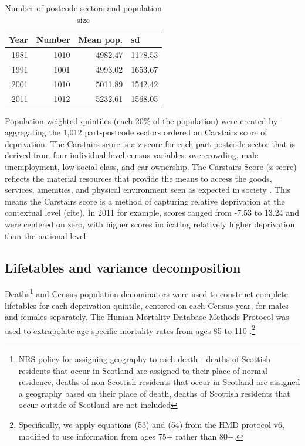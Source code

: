 \documentclass[12pt,oneside,a4paper]{article} %
\theoremstyle{definition}
\begin{document}
\begin{table}[htbp]
  \centering
    \label{tab:PCsect}
  \caption{Number of postcode sectors and population size}
    \begin{tabular}{rrrr}
    \multicolumn{1}{l}{Year} & \multicolumn{1}{l}{Number} & \multicolumn{1}{l}{Mean pop.} & \multicolumn{1}{l}{sd} \\
    \midrule

    1981  & 1010  & 4982.47 & 1178.53 \\
    1991  & 1001  & 4993.02 & 1653.67 \\
    2001  & 1010  & 5011.89 & 1542.42 \\
    2011  & 1012  & 5232.61 & 1568.05 \\
    \bottomrule
    \end{tabular}%
  \label{tab:addlabel}%
\end{table}%


 
Population-weighted quintiles (each 20\% of the population) were created by
aggregating the 1,012 part-postcode sectors ordered on Carstairs score of
deprivation. The Carstairs score is a z-score for each part-postcode sector
that is derived from four individual-level census variables: overcrowding, male
unemployment, low social class, and car ownership. The Carstairs Score
(z-score) reflects the material resources that provide the means to access the
goods, services, amenities, and physical environment seen as expected
in society \citep{Carstairs1989}. This means the Carstairs score is a method of
capturing relative deprivation at the contextual level (cite). In 2011 for example, scores ranged from -7.53 to 13.24 and were centered on zero, with higher scores indicating relatively higher deprivation than the national level.

\subsection{Lifetables and variance decomposition}
Deaths\footnote{NRS policy for assigning geography to each death - deaths of Scottish residents that occur in Scotland are assigned to their place of normal residence, deaths of non-Scottish residents that occur in Scotland are assigned a geography based on their place of death, deaths of Scottish residents that occur outside of Scotland are not included\citep{GeneralRegisterOfficeforScotland2016}} and Census population denominators were used to construct complete
lifetables for each deprivation quintile, centered on each Census year, for
males and females separately.  The Human Mortality Database
Methods Protocol was used to extrapolate age specific mortality rates from
ages 85 to 110 \citep{Wilmoth2017}.\footnote{Specifically, we apply equations (53) and
(54) from the HMD protocol v6, modified to use information from ages 75+
rather than 80+.} 
\end{document}
